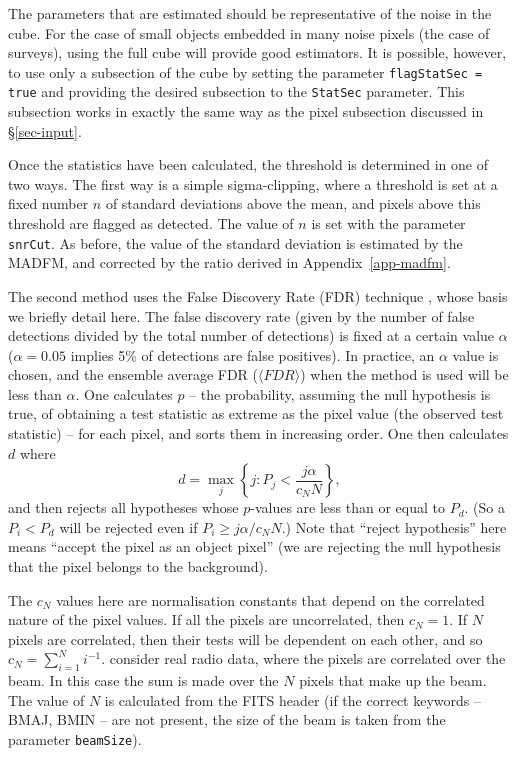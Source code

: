 The parameters that are estimated should be representative of the
noise in the cube. For the case of small objects embedded in many
noise pixels (\eg the case of \hi surveys), using the full cube will
provide good estimators. It is possible, however, to use only a
subsection of the cube by setting the parameter \texttt{flagStatSec =
true} and providing the desired subsection to the \texttt{StatSec}
parameter. This subsection works in exactly the same way as the pixel
subsection discussed in \S\ref{sec-input}.


Once the statistics have been calculated, the threshold is determined
in one of two ways. The first way is a simple sigma-clipping, where a
threshold is set at a fixed number $n$ of standard deviations above
the mean, and pixels above this threshold are flagged as detected. The
value of $n$ is set with the parameter \texttt{snrCut}. As before, the
value of the standard deviation is estimated by the MADFM, and
corrected by the ratio derived in Appendix~\ref{app-madfm}.

The second method uses the False Discovery Rate (FDR) technique
\citep{miller01,hopkins02}, whose basis we briefly detail here. The
false discovery rate (given by the number of false detections divided
by the total number of detections) is fixed at a certain value
$\alpha$ (\eg $\alpha=0.05$ implies 5\% of detections are false
positives). In practice, an $\alpha$ value is chosen, and the ensemble
average FDR (\ie $\langle FDR \rangle$) when the method is used will
be less than $\alpha$.  One calculates $p$ -- the probability,
assuming the null hypothesis is true, of obtaining a test statistic as
extreme as the pixel value (the observed test statistic) -- for each
pixel, and sorts them in increasing order. One then calculates $d$
where
\[
d = \max_j \left\{ j : P_j < \frac{j\alpha}{c_N N} \right\},
\]
and then rejects all hypotheses whose $p$-values are less than or
equal to $P_d$. (So a $P_i<P_d$ will be rejected even if $P_i \geq
j\alpha/c_N N$.) Note that ``reject hypothesis'' here means ``accept
the pixel as an object pixel'' (\ie we are rejecting the null
hypothesis that the pixel belongs to the background).

The $c_N$ values here are normalisation constants that depend on the
correlated nature of the pixel values. If all the pixels are
uncorrelated, then $c_N=1$. If $N$ pixels are correlated, then their
tests will be dependent on each other, and so $c_N = \sum_{i=1}^N
i^{-1}$. \citet{hopkins02} consider real radio data, where the pixels
are correlated over the beam. In this case the sum is made over the
$N$ pixels that make up the beam. The value of $N$ is calculated from
the FITS header (if the correct keywords -- BMAJ, BMIN -- are not
present, the size of the beam is taken from the parameter
\texttt{beamSize}). 

